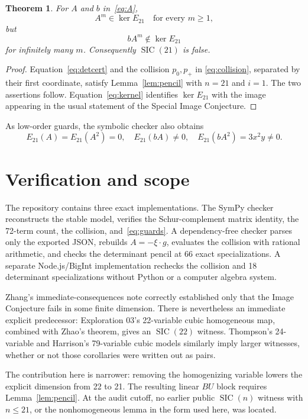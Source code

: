 \documentclass[11pt]{article}
\newtheorem{theorem}{Theorem}
\newcommand{\SIC}{\operatorname{SIC}}
\begin{document}
\begin{theorem}\label{thm:main}
For $A$ and $b$ in~\eqref{eq:A},
\[
 A^m\in\ker E_{21}\quad\text{for every }m\geq1,
\]
but
\[
 bA^m\notin\ker E_{21}
\]
for infinitely many $m$. Consequently $\SIC(21)$ is false.
\end{theorem}

\begin{proof}
Equation~\eqref{eq:detcert} and the collision $p_0,p_+$ in
\eqref{eq:collision}, separated by their first coordinate, satisfy
Lemma~\ref{lem:pencil} with $n=21$ and $i=1$. The two assertions follow.
Equation~\eqref{eq:kernel} identifies $\ker E_{21}$ with the image appearing
in the usual statement of the Special Image Conjecture.
\end{proof}

As low-order guards, the symbolic checker also obtains
\begin{equation}
 E_{21}(A)=E_{21}(A^2)=0,\quad E_{21}(bA)\ne0,\quad
 E_{21}(bA^2)=3x^2y\ne0. \label{eq:guards}
\end{equation}

\section{Verification and scope}

The repository contains three exact implementations. The SymPy
checker reconstructs the stable model, verifies the Schur-complement matrix
identity, the 72-term count, the collision, and~\eqref{eq:guards}. A
dependency-free checker parses only the exported JSON, rebuilds $A=-\xi\cdot
g$, evaluates the collision with rational arithmetic, and checks the
determinant pencil at 66 exact specializations. A separate Node.js/BigInt
implementation rechecks the collision and 18 determinant specializations
without Python or a computer algebra system.

Zhang's immediate-consequences note correctly established only that the Image
Conjecture fails in some finite dimension. There is nevertheless an immediate
explicit predecessor: Exploration 03's 22-variable cubic homogeneous map,
combined with Zhao's theorem, gives an $\SIC(22)$ witness. Thompson's
24-variable and Harrison's 79-variable cubic models similarly imply larger
witnesses, whether or not those corollaries were written out as pairs.

The contribution here is narrower: removing the homogenizing variable lowers
the explicit dimension from 22 to 21. The resulting linear $BU$ block requires
Lemma~\ref{lem:pencil}. At the audit cutoff, no earlier public $\SIC(n)$
witness with $n\leq21$, or the nonhomogeneous lemma in the form used here, was
located.
\end{document}
